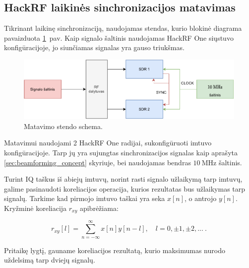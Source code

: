 \documentclass[main.tex]{subfiles}
\begin{document}
\subsection{HackRF laikinės sinchronizacijos matavimas}\label{sec:time_sync}

Tikrinant laikinę sinchronizaciją, naudojamas stendas, kurio
blokinė diagrama pavaizduota \ref{fig:measurement_stand}~pav.
Kaip signalo šaltinis naudojamas HackRF One siųstuvo konfigūracijoje,
jo siunčiamas signalas yra gauso triukšmas.

\begin{figure}[h]
    \begin{centering}
    \includegraphics[scale=0.9]{drawings/measurement_stand}
    \par\end{centering}
    \protect\caption{\label{fig:measurement_stand}Matavimo stendo schema.}
\end{figure}

Matavimui naudojami 2 HackRF One radijai, sukonfigūruoti imtuvo konfigūracijoje.
Tarp jų yra sujungtas sinchronizacijos signalas kaip aprašyta \ref{sec:beamforming_concept}
skyriuje, bei naudojamas bendras $10\ \mathrm{MHz}$ šaltinis.

Turint IQ taškus iš abiejų imtuvų, norint rasti signalo užlaikymą tarp imtuvų, galime
pasinaudoti koreliacijos operacija, kurios rezultatas bus užlaikymas tarp signalų.
Tarkime kad pirmojo imtuvo taškai yra seka $x[n]$, o antrojo $y[n]$. Kryžminė
koreliacija $r_{xy}$ apibrėžiama:

\begin{equation}
    r_{xy}[l] = \sum_{n=-\infty}^\infty x[n]y[n-l],\quad l=0,\pm 1, \pm 2,...\ .
    \label{eq:corelation}
\end{equation}

\noindent Pritaikę  lygtį, gauname koreliacijos rezultatą, kurio
maksimumas nurodo uždelsimą tarp dviejų signalų.
\end{document}
